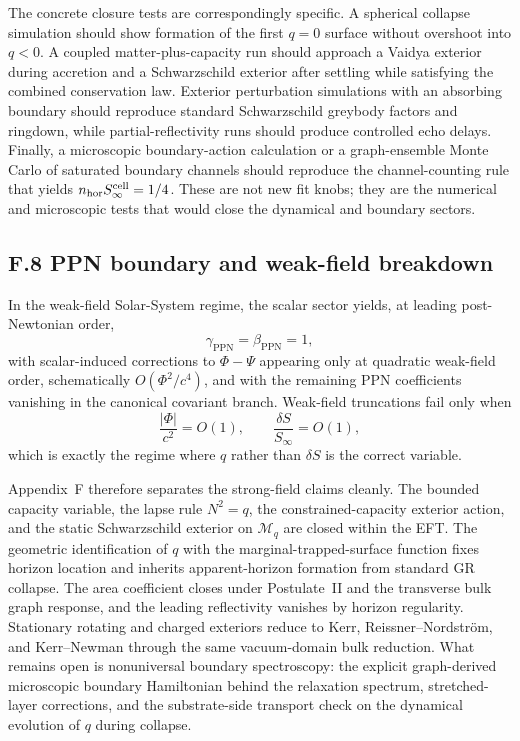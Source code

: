 \documentclass[11pt]{article}
\begin{document}
The concrete closure tests are correspondingly specific. A spherical collapse simulation should show formation of the first $q=0$ surface without overshoot into $q<0$. A coupled matter-plus-capacity run should approach a Vaidya exterior during accretion and a Schwarzschild exterior after settling while satisfying the combined conservation law. Exterior perturbation simulations with an absorbing boundary should reproduce standard Schwarzschild greybody factors and ringdown, while partial-reflectivity runs should produce controlled echo delays. Finally, a microscopic boundary-action calculation or a graph-ensemble Monte Carlo of saturated boundary channels should reproduce the channel-counting rule that yields $n_{\rm hor}S_\infty^{\rm cell}=1/4$. These are not new fit knobs; they are the numerical and microscopic tests that would close the dynamical and boundary sectors.

\subsection*{F.8 PPN boundary and weak-field breakdown}

In the weak-field Solar-System regime, the scalar sector yields, at leading post-Newtonian order,
\[
\gamma_{\mathrm{PPN}}=\beta_{\mathrm{PPN}}=1,
\]
with scalar-induced corrections to $\Phi-\Psi$ appearing only at quadratic weak-field order, schematically $O(\Phi^2/c^4)$, and with the remaining PPN coefficients vanishing in the canonical covariant branch. Weak-field truncations fail only when
\[
\frac{|\Phi|}{c^2}=O(1),
\qquad
\frac{\delta S}{S_\infty}=O(1),
\]
which is exactly the regime where $q$ rather than $\delta S$ is the correct variable.

Appendix~F therefore separates the strong-field claims cleanly. The bounded capacity variable, the lapse rule $N^2=q$, the constrained-capacity exterior action, and the static Schwarzschild exterior on $\mathcal{M}_q$ are closed within the EFT. The geometric identification of $q$ with the marginal-trapped-surface function fixes horizon location and inherits apparent-horizon formation from standard GR collapse. The area coefficient closes under Postulate~II and the transverse bulk graph response, and the leading reflectivity vanishes by horizon regularity. Stationary rotating and charged exteriors reduce to Kerr, Reissner--Nordstr\"om, and Kerr--Newman through the same vacuum-domain bulk reduction. What remains open is nonuniversal boundary spectroscopy: the explicit graph-derived microscopic boundary Hamiltonian behind the relaxation spectrum, stretched-layer corrections, and the substrate-side transport check on the dynamical evolution of $q$ during collapse.
\end{document}
